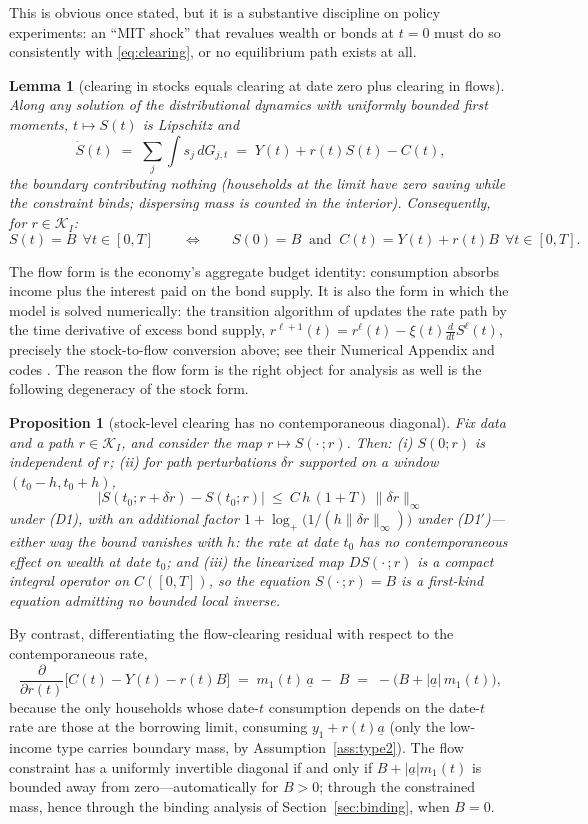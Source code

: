 \documentclass[11pt]{article}
\newtheorem{proposition}[theorem]{Proposition}
\newtheorem{lemma}[theorem]{Lemma}
\theoremstyle{definition}
\theoremstyle{remark}
\newcommand{\ubar}[1]{\underline{#1}}
\newcommand{\Kcal}{\mathcal{K}}
\newcommand{\dd}{\,d}
\newcommand{\uba}{\ubar{a}}
\begin{document}
This is obvious once stated, but it is a substantive discipline on
policy experiments: an ``MIT shock'' that revalues wealth or bonds at
$t=0$ must do so consistently with \eqref{eq:clearing}, or no
equilibrium path exists at all.

\begin{lemma}[clearing in stocks equals clearing at date zero plus
clearing in flows]\label{lem:flow}
Along any solution of the distributional dynamics with uniformly
bounded first moments, $t\mapsto S(t)$ is Lipschitz and
\[
\dot S(t)\;=\;\sum_j\int s_j\dd G_{j,t}\;=\;Y(t)+r(t)S(t)-C(t),
\]
the boundary contributing nothing (households at the limit have zero
saving while the constraint binds; dispersing mass is counted in the
interior). Consequently, for $r\in\Kcal_I$:
\[
S(t)=B\ \ \forall t\in[0,T]
\qquad\Longleftrightarrow\qquad
S(0)=B\ \text{ and }\ C(t)=Y(t)+r(t)B\ \ \forall t\in[0,T].
\]
\end{lemma}

The flow form is the economy's aggregate budget identity: consumption
absorbs income plus the interest paid on the bond supply. It is also
the form in which the model is solved numerically: the transition
algorithm of \citet[\S5.5]{AHLLM2022} updates the rate path by the
time derivative of excess bond supply,
$r^{\ell+1}(t)=r^\ell(t)-\xi(t)\frac{d}{dt}S^\ell(t)$, precisely the
stock-to-flow conversion above; see their Numerical Appendix and
codes \citep{AHLLMnum}. The reason the flow form is the right object
for analysis as well is the following degeneracy of the stock form.

\begin{proposition}[stock-level clearing has no contemporaneous
diagonal]\label{prop:firstkind}
Fix data and a path $r\in\Kcal_I$, and consider the map
$r\mapsto S(\cdot\,;r)$. Then: (i) $S(0;r)$ is independent of $r$;
(ii) for path perturbations $\delta r$ supported on a window
$(t_0-h,t_0+h)$,
\[
|S(t_0;r+\delta r)-S(t_0;r)|\ \le\ C\,h\,(1+T)\,\|\delta r\|_\infty
\]
under (D1), with an additional factor
$1+\log_+\!\big(1/(h\|\delta r\|_\infty)\big)$ under (D1$'$)---either
way the bound vanishes with $h$: the rate at date $t_0$ has no
contemporaneous effect on wealth at date $t_0$; and (iii) the
linearized map $DS(\cdot\,;r)$ is a compact integral operator on
$C([0,T])$, so the equation $S(\cdot\,;r)=B$ is a first-kind equation
admitting no bounded local inverse.
\end{proposition}

By contrast, differentiating the flow-clearing residual with respect
to the contemporaneous rate,
\begin{equation}\label{eq:diagonal}
\frac{\partial}{\partial r(t)}\Big[C(t)-Y(t)-r(t)B\Big]
\;=\;m_1(t)\,\uba\;-\;B\;=\;-\big(B+|\uba|\,m_1(t)\big),
\end{equation}
because the only households whose date-$t$ consumption depends on the
date-$t$ rate are those at the borrowing limit, consuming
$y_1+r(t)\uba$ (only the low-income type carries boundary mass, by
Assumption~\ref{ass:type2}). The flow constraint has a uniformly invertible
diagonal if and only if $B+|\uba|m_1(t)$ is bounded away from
zero---automatically for $B>0$; through the constrained mass, hence
through the binding analysis of Section~\ref{sec:binding}, when
$B=0$.
\end{document}
